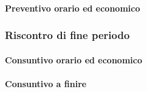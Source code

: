 \paragraph{Preventivo orario ed economico}



\subsubsection{Riscontro di fine periodo}


\paragraph{Consuntivo orario ed economico}


\paragraph{Consuntivo a finire}
